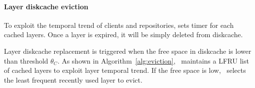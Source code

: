 \paragraph{Layer diskcache eviction}
To exploit the temporal trend of clients and repositories, 
\sysname sets timer for each cached layers.
Once a layer is expired,
it will be simply deleted from diskcache.

Layer diskcache replacement is triggered when the free space in diskcache is
lower than threshold $\theta_{C}$.
As shown in Algorithm~\ref{alg:eviction}, 
\sysname~maintains a LFRU list~\cite{xxx} of cached layers to exploit 
layer temporal trend.
If the free space is low,
\sysname~selects the least frequent recently used layer to evict.




%





